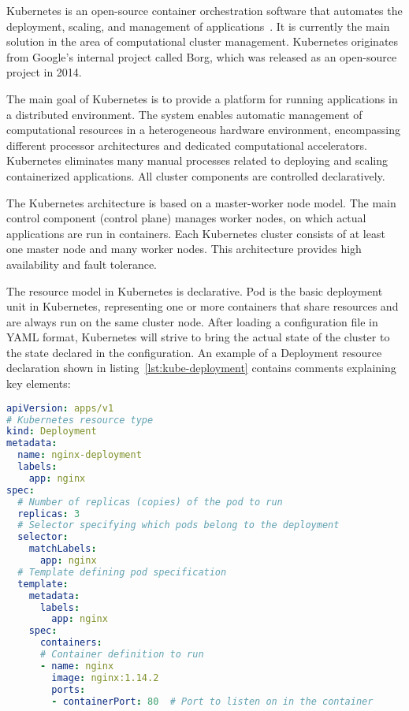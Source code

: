 Kubernetes is an open-source container orchestration software that automates the deployment, scaling, and management of applications~\cite{kubernetes}.
It is currently the main solution in the area of computational cluster management.
Kubernetes originates from Google's internal project called Borg, which was released as an open-source project in 2014.

The main goal of Kubernetes is to provide a platform for running applications in a distributed environment.
The system enables automatic management of computational resources in a heterogeneous hardware environment, encompassing different processor architectures and dedicated computational accelerators.
Kubernetes eliminates many manual processes related to deploying and scaling containerized applications.
All cluster components are controlled declaratively.

The Kubernetes architecture is based on a master-worker node model.
The main control component (control plane) manages worker nodes, on which actual applications are run in containers.
Each Kubernetes cluster consists of at least one master node and many worker nodes.
This architecture provides high availability and fault tolerance.

The resource model in Kubernetes is declarative.
Pod is the basic deployment unit in Kubernetes, representing one or more containers that share resources and are always run on the same cluster node.
After loading a configuration file in YAML format, Kubernetes will strive to bring the actual state of the cluster to the state declared in the configuration.
An example of a Deployment resource declaration shown in listing~\ref{lst:kube-deployment} contains comments explaining key elements:

\begin{lstlisting}[language=yaml,caption={Example Deployment declaration in Kubernetes},label={lst:kube-deployment}]
apiVersion: apps/v1
# Kubernetes resource type
kind: Deployment 
metadata:
  name: nginx-deployment
  labels:
    app: nginx
spec:
  # Number of replicas (copies) of the pod to run
  replicas: 3
  # Selector specifying which pods belong to the deployment
  selector:
    matchLabels:
      app: nginx
  # Template defining pod specification
  template:
    metadata:
      labels:
        app: nginx
    spec:
      containers:
      # Container definition to run
      - name: nginx
        image: nginx:1.14.2
        ports:
        - containerPort: 80  # Port to listen on in the container
\end{lstlisting}


